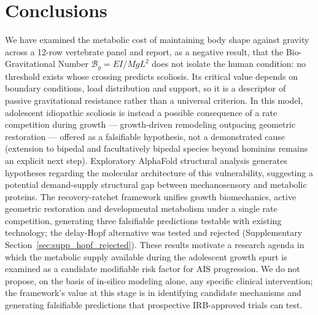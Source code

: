 \section{Conclusions}

We have examined the metabolic cost of maintaining body shape against gravity across a 12-row vertebrate panel and report, as a negative result, that the Bio-Gravitational Number $\mathcal{B}_g = EI/MgL^2$ does not isolate the human condition: no threshold exists whose crossing predicts scoliosis. Its critical value depends on boundary conditions, load distribution and support, so it is a descriptor of passive gravitational resistance rather than a universal criterion. In this model, adolescent idiopathic scoliosis is instead a possible consequence of a rate competition during growth --- growth-driven remodeling outpacing geometric restoration --- offered as a falsifiable hypothesis, not a demonstrated cause (extension to bipedal and facultatively bipedal species beyond hominins remains an explicit next step). Exploratory AlphaFold structural analysis generates hypotheses regarding the molecular architecture of this vulnerability, suggesting a potential demand-supply structural gap between mechanosensory and metabolic proteins. The recovery-ratchet framework unifies growth biomechanics, active geometric restoration and developmental metabolism under a single rate competition, generating three falsifiable predictions testable with existing technology; the delay-Hopf alternative was tested and rejected (Supplementary Section~\ref{sec:supp_hopf_rejected}). These results motivate a research agenda in which the metabolic supply available during the adolescent growth spurt is examined as a candidate modifiable risk factor for AIS progression. We do not propose, on the basis of in-silico modeling alone, any specific clinical intervention; the framework's value at this stage is in identifying candidate mechanisms and generating falsifiable predictions that prospective IRB-approved trials can test.
